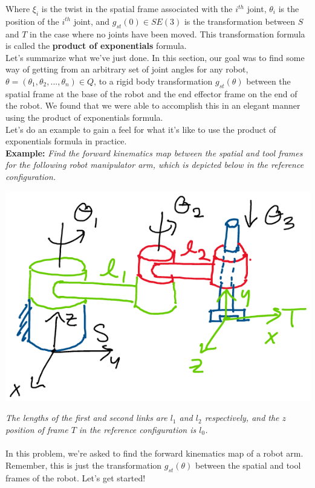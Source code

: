 \documentclass[oneside]{book}
\begin{document}
Where $\xi_i$ is the twist in the spatial frame associated with the $i^{th}$ joint, $\theta_i$ is the position of the $i^{th}$ joint, and $g_{st}(0)\in SE(3)$ is the transformation between $S$ and $T$ in the case where no joints have been moved. This transformation formula is called the \textbf{product of exponentials} formula.\\
Let's summarize what we've just done. In this section, our goal was to find some way of getting from an arbitrary set of joint angles for any robot, $\theta = (\theta_1, \theta_2, ..., \theta_n) \in Q$, to a rigid body transformation $g_{st}(\theta)$ between the spatial frame at the base of the robot and the end effector frame on the end of the robot. We found that we were able to accomplish this in an elegant manner using the product of exponentials formula.\\
Let's do an example to gain a feel for what it's like to use the product of exponentials formula in practice.\\
\noindent
\textbf{Example:} \textit{Find the forward kinematics map between the spatial and tool frames for the following robot manipulator arm, which is depicted below in the reference configuration.}
\begin{center}
    \includegraphics[scale=0.35]{images/forwardKinEx.png}
\end{center}
\textit{The lengths of the first and second links are $l_1$ and $l_2$ respectively, and the $z$ position of frame $T$ in the reference configuration is $l_0$.}\\\\
In this problem, we're asked to find the forward kinematics map of a robot arm. Remember, this is just the transformation $g_{st}(\theta)$ between the spatial and tool frames of the robot. Let's get started!\\
\end{document}
